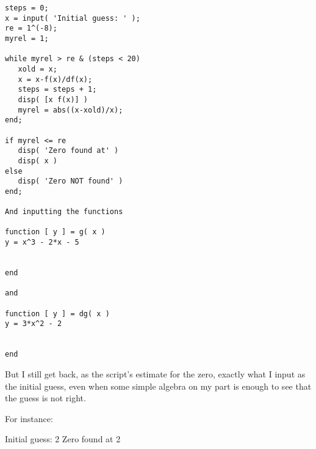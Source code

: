 \documentclass[aps,pre,nofootinbib]{revtex4}
\begin{document}
\begin{enumerate}
\begin{verbatim}
steps = 0;
x = input( 'Initial guess: ' );
re = 1^(-8);
myrel = 1;

while myrel > re & (steps < 20)
   xold = x;
   x = x-f(x)/df(x);
   steps = steps + 1;
   disp( [x f(x)] )
   myrel = abs((x-xold)/x);
end;

if myrel <= re
   disp( 'Zero found at' )
   disp( x )
else
   disp( 'Zero NOT found' )
end;

And inputting the functions

function [ y ] = g( x )
y = x^3 - 2*x - 5


end

and

function [ y ] = dg( x )
y = 3*x^2 - 2


end
\end{verbatim}
But I still get back, as the script's estimate for the zero, exactly what I input as the initial guess, even when some simple algebra on my part is enough to see that the guess is not right.

For instance:

Initial guess: 2
Zero found at
    2

\end{enumerate}
\end{document}
